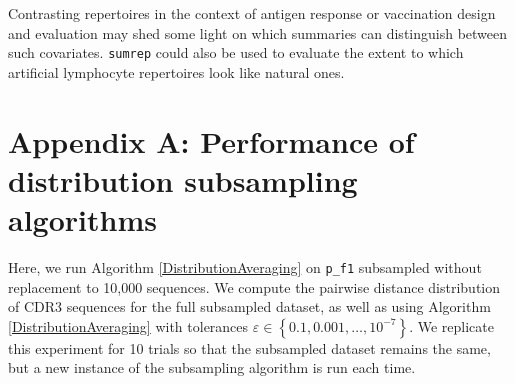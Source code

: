 \documentclass{article}
\begin{document}
Contrasting repertoires in the context of antigen response or vaccination design and evaluation may shed some light on which summaries can distinguish between such covariates.
\texttt{sumrep} could also be used to evaluate the extent to which artificial lymphocyte repertoires look like natural ones\cite{Finlay2012}.





\section*{Appendix A: Performance of distribution subsampling algorithms}
Here, we run Algorithm \ref{DistributionAveraging} on \texttt{p\_f1} subsampled without replacement to 10,000 sequences.
We compute the pairwise distance distribution of CDR3 sequences for the full subsampled dataset, as well as using Algorithm \ref{DistributionAveraging} with tolerances $\varepsilon \in \left\{0.1, 0.001, \dotsc, 10^{-7} \right\}$.
We replicate this experiment for 10 trials so that the subsampled dataset remains the same, but a new instance of the subsampling algorithm is run each time.
\end{document}
